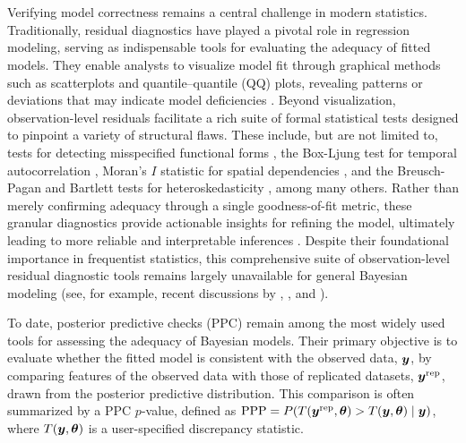 
\newcommand{\SIref}[1]{\ref{S-#1}}

\section{}\label{Introduction}

Verifying model correctness remains a central challenge in modern statistics. Traditionally, residual diagnostics have played a pivotal role in regression modeling, serving as indispensable tools for evaluating the adequacy of fitted models. They enable analysts to visualize model fit through graphical methods such as scatterplots and quantile--quantile (QQ) plots, revealing patterns or deviations that may indicate model deficiencies \citep{Anscombe1973}. Beyond visualization, observation-level residuals facilitate a rich suite of formal statistical tests designed to pinpoint a variety of structural flaws. These include, but are not limited to, tests for detecting misspecified functional forms \citep{Ramsey1969}, the Box-Ljung test for temporal autocorrelation \citep{Ljung1978}, Moran's $I$ statistic for spatial dependencies \citep{Moran1950}, and the Breusch-Pagan and Bartlett tests for heteroskedasticity \citep{Breusch1979, Bartlett1937}, among many others. Rather than merely confirming adequacy through a single goodness-of-fit metric, these granular diagnostics provide actionable insights for refining the model, ultimately leading to more reliable and interpretable inferences \citep{Cook1982, Draper1998}. Despite their foundational importance in frequentist statistics, this comprehensive suite of observation-level residual diagnostic tools remains largely unavailable for general Bayesian modeling (see, for example, recent discussions by \citet{Liu2018Residuals}, \citet{Liu2025Unified}, and \citet{moranHoldoutPredictiveChecks2024}).

To date, posterior predictive checks (PPC) \citep{Rubin1984, GelmanAndrew1996PPAO, gabry2019visualization, sailynoja2021graphical} remain among the most widely used tools for assessing the adequacy of Bayesian models. Their primary objective is to evaluate whether the fitted model is consistent with the observed data, $\bm{y}$, by comparing features of the observed data with those of replicated datasets, $\bm{y}^{\text{rep}}$, drawn from the posterior predictive distribution. This comparison is often summarized by a PPC $p$-value, defined as $\text{PPP} = P(T(\bm{y}^{\text{rep}}, \bm{\theta}) > T(\bm{y}, \bm{\theta}) \mid \bm{y})$, where $T(\bm{y}, \bm{\theta})$ is a user-specified discrepancy statistic.

